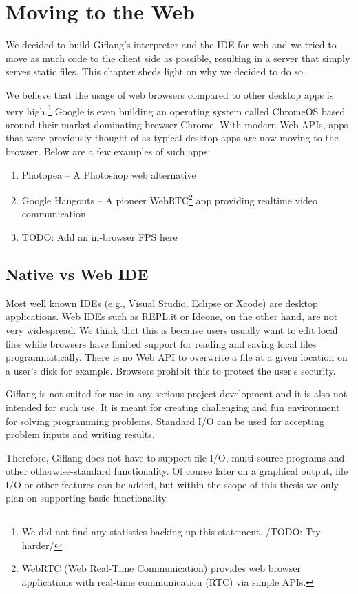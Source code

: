\chapter{Moving to the Web}
We decided to build Giflang's interpreter and the IDE for web and we tried to move as much code to the client side as possible, resulting in a server that
simply serves static files. This chapter sheds light on why we decided to do so.

We believe that the usage of web browsers compared to other desktop apps is very high.\footnote{We did not
find any statistics backing up this statement. /TODO: Try harder/} Google is even building an operating system called ChromeOS based around their
market-dominating browser Chrome. With modern Web APIs, apps that were previously thought of as typical desktop apps are now moving to the browser. Below
are a few examples of such apps:
\begin{enumerate}
\item Photopea \cite{Photopea} -- A Photoshop web alternative
\item Google Hangouts \cite{Hangouts} -- A pioneer WebRTC\footnote{WebRTC (Web Real-Time Communication) provides web browser 
applications with real-time communication (RTC) via simple APIs.} app providing realtime video communication
\item TODO: Add an in-browser FPS here
\end{enumerate}

\section{Native vs Web IDE}
Most well known IDEs (e.g., Visual Studio, Eclipse or Xcode) are desktop applications. Web IDEs such as REPL.it or Ideone, on the other hand,
are not very widespread. We think that this is because users usually want to edit local files while browsers have limited support for reading
and saving local files programmatically. There is no Web API to overwrite a file at a given location on a user's disk for example.
Browsers prohibit this to protect the user's security.

Giflang is not suited for use in any serious project development and it is also not intended for such use. It is meant for creating
challenging and fun environment for solving programming problems. Standard I/O can be used for accepting problem inputs and writing results.

Therefore, Giflang does not have to support file I/O, multi-source programs and other otherwise-standard functionality. Of course later
on a graphical output, file I/O or other features can be added, but within the scope of this thesis we only plan on supporting
basic functionality.

